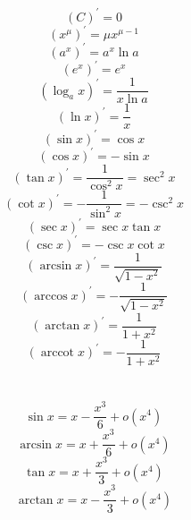 \documentclass[]{article}
\numberwithin{equation}{section}
\DeclareMathOperator{\arccot}{arccot}
\begin{document}
\section{}
\begin{equation}
    (C)^{'}=0
\end{equation}
\begin{equation}
    (x^\mu)^{'}=\mu x^{\mu -1}
\end{equation}
\begin{equation}
    (a^x)^{'}=a^x\ln a
\end{equation}
\begin{equation}
    (e^x)^{'}=e^x
\end{equation}
\begin{equation}
    (\log_a x)^{'}=\frac{1}{x\ln a}
\end{equation}
\begin{equation}
    (\ln x)^{'}=\frac{1}{x}
\end{equation}
\begin{equation}
    (\sin x)^{'}=\cos x
\end{equation}
\begin{equation}
    (\cos x)^{'}=-\sin x
\end{equation}
\begin{equation}
    (\tan x)^{'}=\frac{1}{\cos^2 x}=\sec^2 x
\end{equation}
\begin{equation}
    (\cot x)^{'}=-\frac{1}{\sin^2 x}=-\csc^2 x
\end{equation}
\begin{equation}
    (\sec x)^{'}=\sec x\tan x
\end{equation}
\begin{equation}
    (\csc x)^{'}=-\csc x\cot x
\end{equation}
\begin{equation}
    (\arcsin x)^{'}=\frac{1}{\sqrt{1-x^2}}
\end{equation}
\begin{equation}
    (\arccos x)^{'}=-\frac{1}{\sqrt{1-x^2}}
\end{equation}
\begin{equation}
    (\arctan x)^{'}=\frac{1}{1+x^2}
\end{equation}
\begin{equation}
    (\arccot x)^{'}=-\frac{1}{1+x^2}
\end{equation}

\section{}
\begin{equation}
    \sin x=x-\frac{x^3}{6}+o(x^4)
\end{equation}
\begin{equation}
    \arcsin x=x+\frac{x^3}{6}+o(x^4)
\end{equation}
\begin{equation}
    \tan x=x+\frac{x^3}{3}+o(x^4)
\end{equation}
\begin{equation}
    \arctan x=x-\frac{x^3}{3}+o(x^4)
\end{equation}
\end{document}
